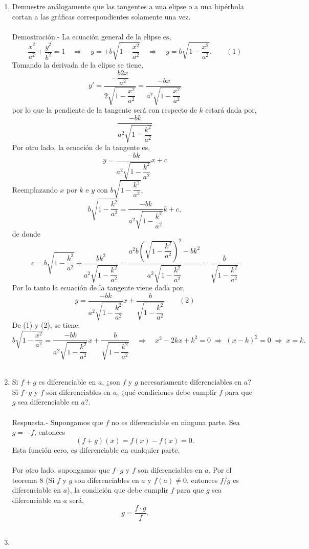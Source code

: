 \begin{enumerate}[\bfseries 1.]
     \item Demuestre análogamente que las tangentes a una elipse o a una hipérbola cortan a las gráficas correspondientes solamente una vez.\\\\
	 Demostración.-\; La ecuación general de la elipse es,
	 $$\dfrac{x^2}{a^2}+\dfrac{y^2}{b^2}=1 \quad \Rightarrow \quad y=\pm b \sqrt{1-\dfrac{x^2}{a^2}} \quad \Rightarrow \quad y= b \sqrt{1-\dfrac{x^2}{a^2}}.\qquad (1)$$
	 Tomando la derivada de la elipse se tiene,
	 $$y'=\dfrac{-\dfrac{b2x}{a^2}}{2\sqrt{1-\dfrac{x^2}{a^2}}}=\dfrac{-bx}{a^2\sqrt{1-\dfrac{x^2}{a^2}}}$$
	 por lo que la pendiente de la tangente será con respecto de $k$ estará dada por,
	 $$\dfrac{-bk}{a^2\sqrt{1-\dfrac{k^2}{a^2}}}$$
	 Por otro lado, la ecuación de la tangente es,
	 $$y=\dfrac{-bk}{a^2\sqrt{1-\dfrac{k^2}{a^2}}}x+c$$
	 Reemplazando $x$ por $k$ e $y$ con $b\sqrt{1-\dfrac{k^2}{a^2}}$,
	 $$b\sqrt{1-\dfrac{k^2}{a^2}}=\dfrac{-bk}{a^2\sqrt{1-\dfrac{k^2}{a^2}}}k+c,$$
	 de donde 
	 $$c=b\sqrt{1-\dfrac{k^2}{a^2}}+\dfrac{bk^2}{a^2\sqrt{1-\dfrac{k^2}{a^2}}}=\dfrac{a^2 b\left(\sqrt{ 1-\dfrac{k^2}{a^2}}\right)^2 - bk^2}{a^2 \sqrt{ 1- \dfrac{k^2}{a^2}} }=\dfrac{b}{\sqrt{1-\dfrac{k^2}{a^2}}}$$
	 Por lo tanto la ecuación de la tangente viene dada por,
	 $$y=\dfrac{-bk}{a^2\sqrt{1-\dfrac{k^2}{a^2}}}x+\dfrac{b}{\sqrt{1-\dfrac{k^2}{a^2}}}\qquad (2)$$
	 De (1) y (2), se tiene,
	 $$b\sqrt{1-\dfrac{x^2}{a^2}}=\dfrac{-bk}{a^2\sqrt{1-\dfrac{k^2}{a^2}}} x + \dfrac{b}{\sqrt{1-\dfrac{k^2}{a^2}}}\quad \Rightarrow \quad x^2-2kx+k^2=0\; \Rightarrow \; (x-k)^2=0\; \Rightarrow \; x=k.$$\\

     \item Si $f+g$ es diferenciable en $a$, ¿son $f$ y $g$ necesariamente diferenciables en $a$? Si $f\cdot g$ y $f$ son diferenciables en $a$, ¿qué condiciones debe cumplir $f$ para que $g$ sea diferenciable en $a$?.\\\\
	 Respuesta.-\; Supongamos que $f$ no es diferenciable en ninguna parte. Sea $g=-f$, entonces  
	 $$(f+g)(x)=f(x)-f(x)=0.$$
	 Esta función cero, es diferenciable en cualquier parte.\\\\
	 Por otro lado, supongamos que $f\cdot g$ y $f$ son diferenciables en $a$. Por el teorema 8 (Si $f$ y $g$ son diferenciables en $a$ y $f(a)\neq 0$, entonces $f/g$ es diferenciable en $a$), la condición que debe cumplir $f$ para que $g$ sea diferenciable en $a$ será, 
	 $$g=\dfrac{f\cdot g}{f}.$$\\

     \item 


\end{enumerate}
